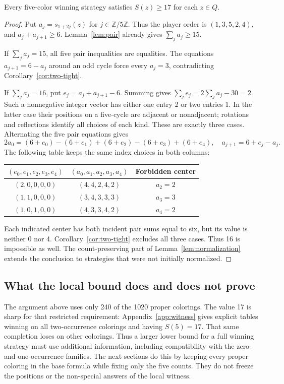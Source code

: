 \begin{proposition}\label{prop:seventeen}
Every five-color winning strategy satisfies $S(z)\geq17$ for each $z\in Q$.
\end{proposition}
\begin{proof}
Put $a_j=s_{1+2j}(z)$ for $j\in\mathbb Z/5\mathbb Z$. Thus the player
order is $(1,3,5,2,4)$, and $a_j+a_{j+1}\geq6$. Lemma~\ref{lem:pair}
already gives $\sum_j a_j\geq15$.

If $\sum_j a_j=15$, all five pair inequalities are equalities. The equations
$a_{j+1}=6-a_j$ around an odd cycle force every $a_j=3$, contradicting
Corollary~\ref{cor:two-tight}.

If $\sum_j a_j=16$, put $e_j=a_j+a_{j+1}-6$. Summing gives
$\sum_j e_j=2\sum_j a_j-30=2$. Such a nonnegative integer vector has
either one entry 2 or two entries 1. In the latter case their positions
on a five-cycle are adjacent or nonadjacent; rotations and reflections
identify all choices of each kind. These are exactly three cases.
Alternating the five pair equations gives
\[
2a_0=(6+e_0)-(6+e_1)+(6+e_2)-(6+e_3)+(6+e_4),
\quad a_{j+1}=6+e_j-a_j.
\]
The following table keeps the same index choices in both columns:
\begin{center}\small
\begin{tabular}{@{}ccc@{}}
\toprule
$(e_0,e_1,e_2,e_3,e_4)$&$(a_0,a_1,a_2,a_3,a_4)$&Forbidden center\\
\midrule
$(2,0,0,0,0)$&$(4,4,2,4,2)$&$a_2=2$\\
$(1,1,0,0,0)$&$(3,4,3,3,3)$&$a_3=3$\\
$(1,0,1,0,0)$&$(4,3,3,4,2)$&$a_4=2$\\
\bottomrule
\end{tabular}
\end{center}
Each indicated center has both incident pair sums equal to six, but its
value is neither 0 nor 4. Corollary~\ref{cor:two-tight} excludes all
three cases. Thus 16 is impossible as well.
The count-preserving part of Lemma~\ref{lem:normalization} extends the
conclusion to strategies that were not initially normalized.
\end{proof}

\subsection{What the local bound does and does not prove}
The argument above uses only 240 of the 1020 proper colorings. The value
17 is sharp for that restricted requirement: Appendix~\ref{app:witness}
gives explicit tables winning on all two-occurrence colorings and having
$S(5)=17$. That same completion loses on other colorings. Thus a larger
lower bound for a full winning strategy must use additional information,
including compatibility with the zero- and one-occurrence families.
The next sections do this by keeping every proper coloring in the base
formula while fixing only the five counts. They do not freeze the
positions or the non-special answers of the local witness.

